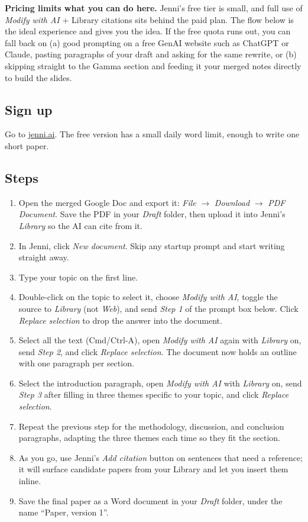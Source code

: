 \documentclass[11pt,a4paper]{article}
\begin{document}
\begin{watchout}
\textbf{Pricing limits what you can do here.} Jenni's free tier is small, and full use of \emph{Modify with AI} + Library citations sits behind the paid plan. The flow below is the ideal experience and gives you the idea. If the free quota runs out, you can fall back on (a) good prompting on a free GenAI website such as ChatGPT or Claude, pasting paragraphs of your draft and asking for the same rewrite, or (b) skipping straight to the Gamma section and feeding it your merged notes directly to build the slides.
\end{watchout}

\subsection*{Sign up}
Go to \href{https://jenni.ai/}{jenni.ai}. The free version has a small daily word limit, enough to write one short paper.

\subsection*{Steps}
\begin{enumerate}[leftmargin=*, itemsep=2pt]
  \item Open the merged Google Doc and export it: \emph{File} \(\to\) \emph{Download} \(\to\) \emph{PDF Document}. Save the PDF in your \emph{Draft} folder, then upload it into Jenni's \emph{Library} so the AI can cite from it.
  \item In Jenni, click \emph{New document}. Skip any startup prompt and start writing straight away.
  \item Type your topic on the first line.
  \item Double-click on the topic to select it, choose \emph{Modify with AI}, toggle the source to \emph{Library} (not \emph{Web}), and send \emph{Step 1} of the prompt box below. Click \emph{Replace selection} to drop the answer into the document.
  \item Select all the text (Cmd/Ctrl-A), open \emph{Modify with AI} again with \emph{Library} on, send \emph{Step 2}, and click \emph{Replace selection}. The document now holds an outline with one paragraph per section.
  \item Select the introduction paragraph, open \emph{Modify with AI} with \emph{Library} on, send \emph{Step 3} after filling in three themes specific to your topic, and click \emph{Replace selection}.
  \item Repeat the previous step for the methodology, discussion, and conclusion paragraphs, adapting the three themes each time so they fit the section.
  \item As you go, use Jenni's \emph{Add citation} button on sentences that need a reference; it will surface candidate papers from your Library and let you insert them inline.
  \item Save the final paper as a Word document in your \emph{Draft} folder, under the name ``Paper, version 1''.
\end{enumerate}
\end{document}
